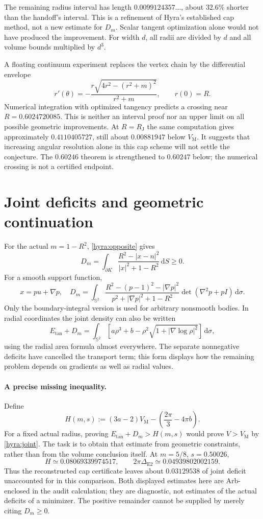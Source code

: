 \documentclass[11pt]{article}
\theoremstyle{remark}\newtheorem{remark}[theorem]{Remark}
\newcommand{\Sph}{\mathbb S^2}
\newcommand{\VM}{V_{\mathrm M}}
\newcommand{\RJ}{R_{\mathrm J}}
\newcommand{\dd}{\,\mathrm d}
\newcommand{\Et}{E_{\mathrm{tan}}}
\begin{document}
The remaining radius interval has length $0.0099124357\ldots$, about $32.6\%$ shorter than the handoff's interval. This is a refinement of Hyra's established cap method, not a new estimate for $D_m$. Scalar tangent optimization alone would not have produced the improvement. For width $d$, all radii are divided by $d$ and all volume bounds multiplied by $d^3$.



A floating continuum experiment replaces the vertex chain by the differential envelope
\[
 r'(\theta)=-\frac{r\sqrt{4r^2-(r^2+m)^2}}{r^2+m},\qquad r(0)=R.
\]
Numerical integration with optimized tangency predicts a crossing near $R=0.6024720085$. This is neither an interval proof nor an upper limit on all possible geometric improvements. At $R=\RJ$ the same computation gives approximately $0.4110405727$, still about $0.00881947$ below $\VM$. It suggests that increasing angular resolution alone in this cap scheme will not settle the conjecture. The $0.60246$ theorem is strengthened to $0.60247$ below; the numerical crossing is not a certified endpoint.

\section{Joint deficits and geometric continuation}
For the actual $m=1-R^2$, \eqref{hyra:opposite} gives
\[
 D_m=\int_{\partial K}\frac{R^2-|x-n|^2}{|x|^2+1-R^2}\dd S\geq0.
\]
For a smooth support function,
\[
 x=p u+\nabla p,\quad
 D_m=\int_{\Sph}\frac{R^2-(p-1)^2-|\nabla p|^2}{p^2+|\nabla p|^2+1-R^2}
 \det(\nabla^2p+pI)\dd\sigma.
\]
Only the boundary-integral version is used for arbitrary nonsmooth bodies. In radial coordinates the joint density can also be written
\begin{equation}\label{hyra:jointdensity}
 \Et+D_m=\int_{\Sph}\left[a\rho^3+b-\rho^2\sqrt{1+|\nabla\log\rho|^2}\right]\dd\sigma,
\end{equation}
using the radial area formula almost everywhere. The separate nonnegative deficits have cancelled the transport term; this form displays how the remaining problem depends on gradients as well as radial values.

\paragraph{A precise missing inequality.}
Define
\[
 H(m,s):=(3a-2)\VM-\left(\frac{2\pi}{3}-4\pi b\right).
\]
For a fixed actual radius, proving $\Et+D_m>H(m,s)$ would prove $V>\VM$ by \eqref{hyra:joint}. The task is to obtain that estimate from geometric constraints, rather than from the volume conclusion itself. At $m=5/8$, $s=0.50026$,
\[
 H\simeq0.08069339974517,\qquad
 2\pi\Delta_{\mathrm{E2}}\simeq0.04939802002159.
\]
Thus the reconstructed cap certificate leaves about $0.03129538$ of joint deficit unaccounted for in this comparison. Both displayed estimates here are Arb-enclosed in the audit calculation; they are diagnostic, not estimates of the actual deficits of a minimizer. The positive remainder cannot be supplied by merely citing $D_m\geq0$.
\end{document}
